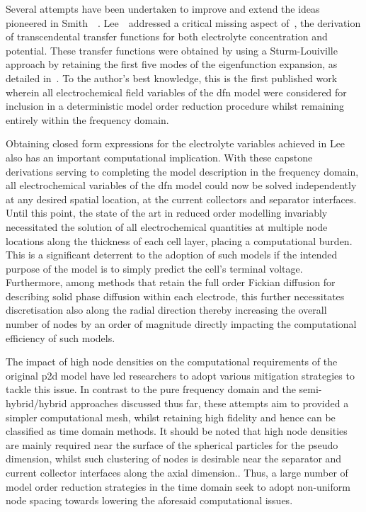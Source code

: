 Several attempts have been undertaken to  improve and extend the ideas pioneered
in  Smith~\etal{}~\cite{Smith2007}.  Lee~\etal{}~addressed  a  critical  missing
aspect  of~\cite{Smith2007}, \viz{}  the derivation  of transcendental  transfer
functions  for  both electrolyte  concentration  and  potential. These  transfer
functions were  obtained by  using a Sturm-Louiville  approach by  retaining the
first five modes of the  eigenfunction expansion, as detailed in~\cite{Lee2012}.
To the  author's best knowledge,  this is the  first published work  wherein all
electrochemical  field variables  of  the \gls{dfn}  model  were considered  for
inclusion in  a deterministic model  order reduction procedure  whilst remaining
entirely within the frequency domain.

Obtaining  closed form  expressions for  the electrolyte  variables achieved  in
Lee~\etal{} also has an important computational implication. With these capstone
derivations serving to completing the model description in the frequency domain,
all  electrochemical  variables of  the  \gls{dfn}  model  could now  be  solved
independently at any  desired spatial location, \eg{} at  the current collectors
and separator  interfaces. Until  this point,  the state of  the art  in reduced
order  modelling invariably  necessitated  the solution  of all  electrochemical
quantities at  multiple node locations along  the thickness of each  cell layer,
placing a computational burden. This is  a significant deterrent to the adoption
of such  models if the intended  purpose of the  model is to simply  predict the
cell's terminal voltage.  Furthermore, among methods that retain  the full order
Fickian diffusion  for describing solid  phase diffusion within  each electrode,
this further necessitates discretisation also along the radial direction thereby
increasing  the overall  number  of  nodes by  an  order  of magnitude  directly
impacting the computational efficiency of such models.

The  impact of  high node  densities on  the computational  requirements of  the
original  \gls{p2d}  model have  led  researchers  to adopt  various  mitigation
strategies to  tackle this issue. In  contrast to the pure  frequency domain and
the  semi-hybrid/hybrid approaches  discussed thus  far, these  attempts aim  to
provided a simpler computational mesh,  whilst retaining high fidelity and hence
can be  classified as  time domain methods.  It should be  noted that  high node
densities are  mainly required near the  surface of the spherical  particles for
the  pseudo   dimension,  whilst  such  clustering of  nodes  is
desirable near  the separator and  current collector interfaces along  the axial
dimension..  Thus, a
large number  of model  order reduction  strategies in the  time domain  seek to
adopt  non-uniform node  spacing  towards lowering  the aforesaid  computational
issues.

